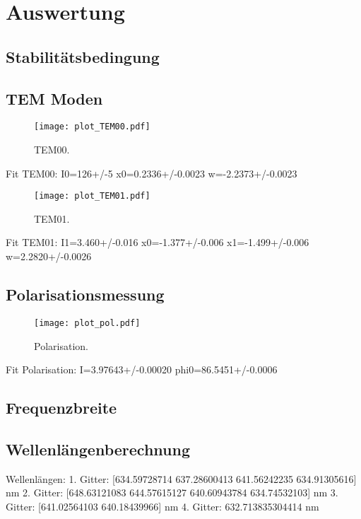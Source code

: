\section{Auswertung}
\label{sec:Auswertung}

\subsection{Stabilitätsbedingung}

\subsection{TEM Moden}

\begin{figure}[H]
  \centering
  \texttt{[image: plot\_TEM00.pdf]}
  \caption{TEM00.}
  \label{fig:TEM00}
\end{figure}

Fit TEM00:
I0=126+/-5
x0=0.2336+/-0.0023
w=-2.2373+/-0.0023

\begin{figure}[H]
  \centering
  \texttt{[image: plot\_TEM01.pdf]}
  \caption{TEM01.}
  \label{fig:TEM01}
\end{figure}

Fit TEM01:
I1=3.460+/-0.016
x0=-1.377+/-0.006
x1=-1.499+/-0.006
w=2.2820+/-0.0026

\subsection{Polarisationsmessung}

\begin{figure}[H]
  \centering
  \texttt{[image: plot\_pol.pdf]}
  \caption{Polarisation.}
  \label{fig:polarisation}
\end{figure}

Fit Polarisation:
I=3.97643+/-0.00020
phi0=86.5451+/-0.0006

\subsection{Frequenzbreite}

\subsection{Wellenlängenberechnung}

Wellenlängen:
 1. Gitter: [634.59728714 637.28600413 641.56242235 634.91305616] nm
 2. Gitter: [648.63121083 644.57615127 640.60943784 634.74532103] nm
 3. Gitter: [641.02564103 640.18439966] nm
 4. Gitter: 632.713835304414 nm